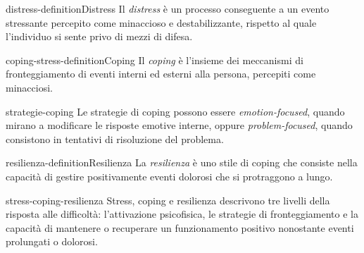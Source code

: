 \documentclass[preview]{standalone}
\begin{document}
\begin{snippetdefinition}{distress-definition}{Distress}
    Il \emph{distress} è un processo conseguente a un evento stressante percepito
    come minaccioso e destabilizzante, rispetto al quale l'individuo si sente
    privo di mezzi di difesa.
\end{snippetdefinition}

\begin{snippetdefinition}{coping-stress-definition}{Coping}
    Il \emph{coping} è l'insieme dei meccanismi di fronteggiamento di eventi
    interni ed esterni alla persona, percepiti come minacciosi.
\end{snippetdefinition}

\begin{snippet}{strategie-coping}
    Le strategie di coping possono essere \emph{emotion-focused}, quando mirano
    a modificare le risposte emotive interne, oppure \emph{problem-focused},
    quando consistono in tentativi di risoluzione del problema.
\end{snippet}


\begin{snippetdefinition}{resilienza-definition}{Resilienza}
    La \emph{resilienza} è uno stile di coping che consiste nella capacità di
    gestire positivamente eventi dolorosi che si protraggono a lungo.
\end{snippetdefinition}

\begin{snippet}{stress-coping-resilienza}
    Stress, coping e resilienza descrivono tre livelli della risposta alle
    difficoltà: l'attivazione psicofisica, le strategie di fronteggiamento e la
    capacità di mantenere o recuperare un funzionamento positivo nonostante
    eventi prolungati o dolorosi.
\end{snippet}
\end{document}
